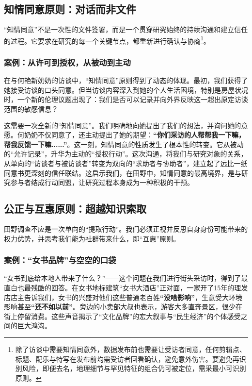 \documentclass[UTF8]{ctexart}
\begin{document}
\subsection{知情同意原则：对话而非文件}
“知情同意”不是一次性的文件签署，而是一个贯穿研究始终的持续沟通和建立信任的过程。它要求在研究的每一个关键节点，都重新进行确认与协商\footnote[3]{除了访谈中需要知情同意外，数据发布前也需要让受访者同意，任何剪辑点、标题、配乐与特写在发布前均需受访者回看确认，避免意外伤害。要避免再识别风险，即便去名，地理细节与罕见特征的组合仍可被定位，需采最小可识别原则。}。

\subsubsection{案例：从许可到授权，从被动到主动}
在与何艳新奶奶的访谈中，“知情同意”原则得到了动态的体现。最初，我们获得了她接受访谈的口头同意。但当访谈内容深入到她的个人生活困境，特别是房屋状况时，一个新的伦理议题出现了：我们是否可以记录并向外界反映这一超出原定访谈范围的敏感信息？

这需要一次全新的“知情同意”。我们明确地向她提出了我们的想法，并询问她的意愿。何奶奶不仅同意了，还主动提出了她的期望：\textbf{“你们采访的人帮帮我一下嘛，帮我反馈一下嘛......”}。这一刻，知情同意的性质发生了根本性的转变。它从被动的“允许记录”，升华为主动的“授权行动”。这次沟通，将我们与研究对象的关系，从单向的“访谈者与被访谈者”转变为双向的“求助者与协助者”，建立起了远比一纸同意书更深刻的信任联结。这启示我们，在田野中，知情同意的最高境界，是与研究参与者结成行动同盟，让研究过程本身成为一种积极的干预。

\subsection{公正与互惠原则：超越知识索取}
田野调查不应是一次单向的“提取行动”。我们必须正视并反思自身身份可能带来的权力优势，并思考我们能为社群带来什么，即“互惠”原则。

\subsubsection{案例：“女书品牌”与空空的口袋}
“女书到底给本地人带来了什么？”——这个问题在我们进行街头采访时，得到了最直白也最残酷的回答。在女书地标建筑“女书大酒店”正对面，一家开了15年的理发店店主告诉我们，女书的兴盛对他们这些普通老百姓\textbf{“没啥影响”}，生意受大环境影响甚至\textbf{“还不如以前”}。旁边的小卖部大叔也表示，游客大多直奔景区，很少在街上停留消费。这些声音揭示了“文化品牌”的宏大叙事与“民生经济”的个体感受之间的巨大鸿沟。
\end{document}
